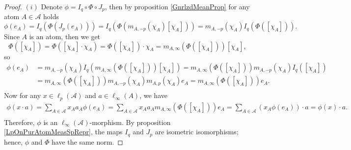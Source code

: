 \documentclass[12pt]{article}
\begin{document}
\begin{proof} 
    $(i)$ Denote $\phi=I_q\circ \Phi\circ J_p$, then by 
    proposition \ref{GnrlzdMeanProp} for any atom $A\in\mathcal{A}$ holds
    \[
        \phi(e_A)
        =I_q(\Phi(J_p(e_A)))
        =I_q(\Phi(m_{A,-p}(\chi_A)[\chi_A]))
        =m_{A,-p}(\chi_A)I_q(\Phi([\chi_A])).
    \]
    Since $A$ is an atom, then we get
    \[
        \Phi([\chi_A])
        =\Phi([\chi_A]\cdot\chi_A)
        =\Phi([\chi_A])\cdot\chi_A
        =m_{A,\infty}(\Phi([\chi_A]))[\chi_A],
    \]
    so
    \[
    \begin{aligned}
        \phi(e_A)
        &=m_{A,-p}(\chi_A)I_q(m_{A,\infty}(\Phi([\chi_A]))[\chi_A]) 
        =m_{A,\infty}(\Phi([\chi_A]))m_{A,-p}(\chi_A)I_q([\chi_A]) \\
        &=m_{A,\infty}(\Phi([\chi_A]))m_{A,-p}(\chi_A)m_{A,p}(\chi_A)e_A 
        =m_{A,\infty}(\Phi([\chi_A]))e_A. \\
    \end{aligned}
    \]
    Now for any $x\in\ell_p(\mathcal{A})$ and $a\in\ell_\infty(A)$, we have
    \[
    \begin{aligned}
        \phi(x\cdot a)
        =\sum_{A\in\mathcal{A}} x_A a_A \phi(e_A) 
        =\sum_{A\in\mathcal{A}} x_A a_A m_{A,\infty}(\Phi([\chi_A]))e_A 
        =\sum_{A\in\mathcal{A}} (x_A \phi(e_A))\cdot a 
        =\phi(x)\cdot a. \\
    \end{aligned}
    \]
    Therefore, $\phi$ is an $\ell_\infty(\mathcal{A})$-morphism. By proposition 
    \ref{LpOnPurAtomMeasSpRepr}, the maps $I_q$ and $J_p$ are isometric 
    isomorphisms; hence, $\phi$ and $\Phi$ have the same norm.


\end{proof}
\end{document}
